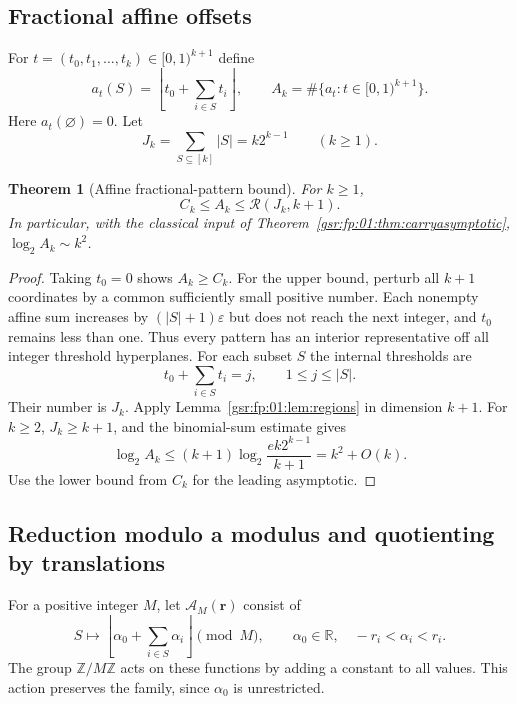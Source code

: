 \documentclass[11pt,letterpaper]{article}
\numberwithin{equation}{section}
\newtheorem{theorem}{Theorem}[section]
\theoremstyle{definition}
\theoremstyle{remark}
\newcommand{\R}{\mathbb R}
\newcommand{\Z}{\mathbb Z}
\newcommand{\1}{\mathbf 1}
\newcommand{\floor}[1]{\left\lfloor#1\right\rfloor}
\newcommand{\RR}[2]{\mathcal R(#1,#2)}
\begin{document}
\subsection{Fractional affine offsets}
For $t=(t_0,t_1,\ldots,t_k)\in[0,1)^{k+1}$ define
\[
 a_t(S)=\floor{t_0+\sum_{i\in S}t_i},\qquad
 A_k=\#\{a_t:t\in[0,1)^{k+1}\}.
\]
Here $a_t(\varnothing)=0$. Let
\begin{equation}\label{gsr:fp:01:eq:J}
 J_k=\sum_{S\subseteq[k]}|S|=k2^{k-1}\qquad(k\ge1).
\end{equation}

\begin{theorem}[Affine fractional-pattern bound]\label{gsr:fp:01:thm:affine}
For $k\ge1$,
\begin{equation}\label{gsr:fp:01:eq:affinebound}
 C_k\le A_k\le\RR{J_k}{k+1}.
\end{equation}
In particular, with the classical input of Theorem~\ref{gsr:fp:01:thm:carryasymptotic},
$\log_2A_k\sim k^2$.
\end{theorem}
\begin{proof}
Taking $t_0=0$ shows $A_k\ge C_k$. For the upper bound, perturb all
$k+1$ coordinates by a common sufficiently small positive number. Each
nonempty affine sum increases by $(|S|+1)\varepsilon$ but does not reach
the next integer, and $t_0$ remains less than one. Thus every pattern
has an interior representative off all integer threshold hyperplanes.
For each subset $S$ the internal thresholds are
\[
 t_0+\sum_{i\in S}t_i=j,\qquad 1\le j\le|S|.
\]
Their number is $J_k$. Apply Lemma~\ref{gsr:fp:01:lem:regions} in dimension $k+1$.
For $k\ge2$, $J_k\ge k+1$, and the binomial-sum estimate gives
\[
 \log_2A_k\le(k+1)\log_2\frac{e k2^{k-1}}{k+1}=k^2+O(k).
\]
Use the lower bound from $C_k$ for the leading asymptotic.
\end{proof}

\subsection{Reduction modulo a modulus and quotienting by translations}
For a positive integer $M$, let $\mathcal A_M(\mathbf r)$ consist of
\[
 S\longmapsto\floor{\alpha_0+\sum_{i\in S}\alpha_i}\pmod M,
 \qquad \alpha_0\in\R,\quad-r_i<\alpha_i<r_i.
\]
The group $\Z/M\Z$ acts on these functions by adding a constant to all
values. This action preserves the family, since $\alpha_0$ is unrestricted.
\end{document}
